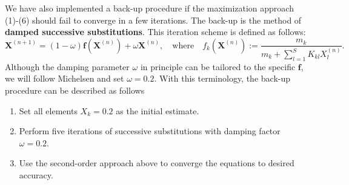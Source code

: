 \documentclass[10pt, a4paper]{article}
\newcommand{\mbf}[0]{\mathbf}
\begin{document}
We have also implemented a back-up procedure if the maximization approach (1)-(6) should fail to converge in a few iterations. The back-up is the method of \textbf{damped successive substitutions}. This iteration scheme is defined as follows:
\begin{equation}
  \label{successiveSubs}
  \mbf X^{(n+1)} = (1-\omega) \mbf f (\mbf X^{(n)}) + \omega \mbf X^{(n)}, \quad \text{where} \quad f_k(\mbf X^{(n)}) := \frac{m_k}{m_k + \sum_{l=1}^S K_{kl} X_l^{(n)}}.
\end{equation}
Although the damping parameter $\omega$ in principle can be tailored to the specific $\mbf f$, we will follow Michelsen \cite{Michelsen06} and set $\omega = 0.2$. With this terminology, the back-up procedure can be described as follows
\begin{enumerate}[(1')]
\item Set all elements $X_k = 0.2$ as the initial estimate.
\item Perform five iterations of successive substitutions with damping factor $\omega = 0.2$.
\item Use the second-order approach above to converge the equations to desired accuracy.
\end{enumerate}
\end{document}
